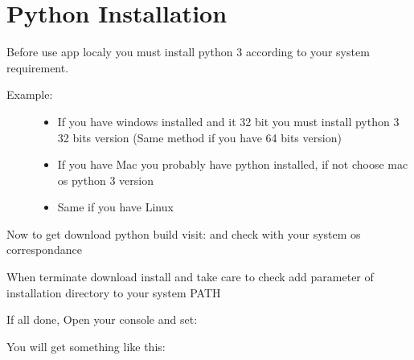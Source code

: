 \documentclass[letterpaper,10pt,english]{sphinxmanual}
\begin{document}
\section{Python Installation}
\label{\detokenize{usage:python-installation}}
Before use app localy you must install python 3 according to your system requirement.
\begin{description}
\item[{Example:}] \leavevmode\begin{itemize}
\item {} 
If you have windows installed and it 32 bit you must install python 3 32 bits version (Same method if you have 64 bits version)

\item {} 
If you have Mac you probably have python installed, if not choose mac os python 3 version

\item {} 
Same if you have Linux

\end{itemize}

\end{description}

Now to get download python build visit:  and check with your system os correspondance

When terminate download install and take care to check add parameter of installation directory to your system PATH

If all done, Open your console and set:

\begin{sphinxVerbatim}[commandchars=\\\{\}]
 
\end{sphinxVerbatim}

You will get something like this:

\begin{sphinxVerbatim}[commandchars=\\\{\}]
       \PYG{p}{[}    \PYG{p}{]}  
        
 
\end{sphinxVerbatim}
\end{document}
